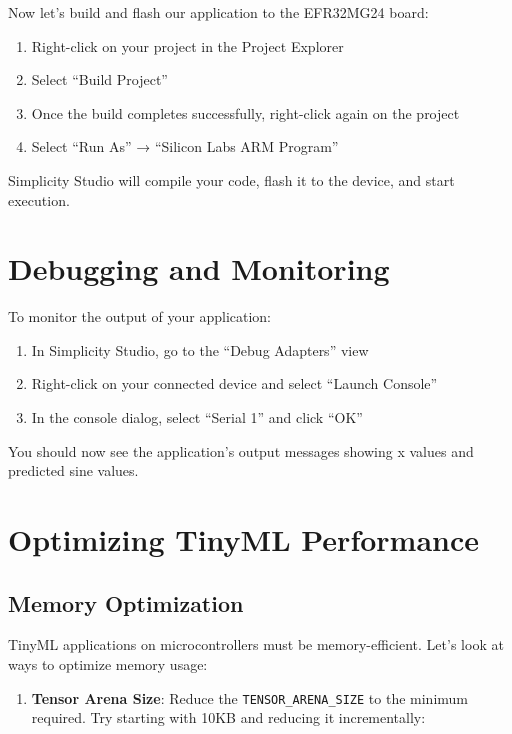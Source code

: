 \documentclass[
  9pt,
  letterpaper,
  abstract,
  titlepage]{scrbook}
\providecommand{\tightlist}{%
  \setlength{\itemsep}{0pt}\setlength{\parskip}{0pt}}\usepackage{longtable,booktabs,array}
\def\tightlist{}
\let\tightlist\relax
\begin{document}
Now let's build and flash our application to the EFR32MG24 board:

\begin{enumerate}
\def\labelenumi{\arabic{enumi}.}
\tightlist
\item
  Right-click on your project in the Project Explorer
\item
  Select ``Build Project''
\item
  Once the build completes successfully, right-click again on the
  project
\item
  Select ``Run As'' → ``Silicon Labs ARM Program''
\end{enumerate}

Simplicity Studio will compile your code, flash it to the device, and
start execution.

\section{Debugging and Monitoring}\label{debugging-and-monitoring}

To monitor the output of your application:

\begin{enumerate}
\def\labelenumi{\arabic{enumi}.}
\tightlist
\item
  In Simplicity Studio, go to the ``Debug Adapters'' view
\item
  Right-click on your connected device and select ``Launch Console''
\item
  In the console dialog, select ``Serial 1'' and click ``OK''
\end{enumerate}

You should now see the application's output messages showing x values
and predicted sine values.

\section{Optimizing TinyML
Performance}\label{optimizing-tinyml-performance}

\subsection{Memory Optimization}\label{memory-optimization}

TinyML applications on microcontrollers must be memory-efficient. Let's
look at ways to optimize memory usage:

\begin{enumerate}
\def\labelenumi{\arabic{enumi}.}
\tightlist
\item
  \textbf{Tensor Arena Size}: Reduce the \texttt{TENSOR\_ARENA\_SIZE} to
  the minimum required. Try starting with 10KB and reducing it
  incrementally:
\end{enumerate}
\end{document}
